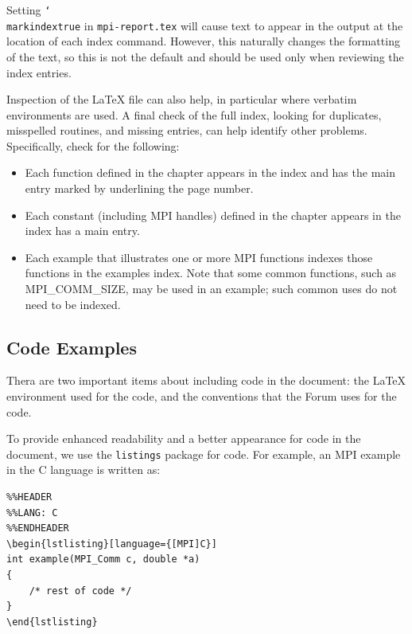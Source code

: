 \documentclass[letterpaper,twoside,11pt,fleqn]{article}
\def\cmd#1{\texttt{\char`\\#1}}
\def\MPI/{\textsf{MPI}}    %
\begin{document}
Setting \cmd{markindextrue} in \texttt{mpi-report.tex} will cause
text to appear in the output at the location of each index command.
However, this naturally changes the formatting of the text, so this is
not the default and should be used only when reviewing the index entries.

Inspection of the LaTeX file can also
help, in particular where verbatim environments are used.  A final check
of the full index, looking for duplicates, misspelled routines, and
missing entries, can help identify other problems.  Specifically,
check for the following:
\begin{itemize}
\item Each function defined in the chapter appears in the index and
  has the main entry marked by underlining the page number.
\item Each constant (including \MPI/ handles) defined in the chapter
  appears in the index has a main entry.
\item Each example that illustrates one or more \MPI/ functions
  indexes those functions in the examples index.
  Note that some common functions, such as \textsf{MPI\_COMM\_SIZE},
  may be used in an example; such common uses do not need to be indexed.
\end{itemize}

\subsection{Code Examples}
\label{sec:code}

Thera are two important items about including code in the document:
the LaTeX environment used for the code, and the conventions that the
Forum uses for the code.

To provide enhanced readability and a better appearance for code in
the document, we use the \verb+listings+ package for code. For
example, an \MPI/ example in the C language is written as:

\begin{verbatim}
%%HEADER
%%LANG: C
%%ENDHEADER
\begin{lstlisting}[language={[MPI]C}]
int example(MPI_Comm c, double *a)
{
    /* rest of code */
}
\end{lstlisting}
\end{verbatim}
\end{document}
